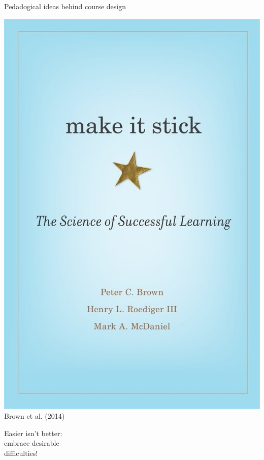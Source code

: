 \documentclass[aspectratio=169]{beamer}
\newenvironment{Slide}[1]%
  {\begin{frame}[environment=Slide]{#1}}
  {\end{frame}}%
\begin{document}
\begin{Slide}{Pedadogical ideas behind course design}
\begin{minipage}{0.3\textwidth}
\begin{itemize}
      \end{itemize}
  \end{minipage}%
  \begin{minipage}{0.22\textwidth}
      \includegraphics[height=0.52\textheight]{Pictures/brown}\\
      {\small Brown et al. (2014)}
    \end{minipage}%
    \begin{minipage}{0.25\textwidth}
        Easier isn't better: \\        
        embrace desirable\\difficulties!
    \end{minipage}
\end{Slide}
\end{document}
